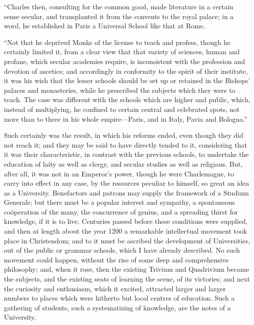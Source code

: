 ``Charles then, consulting
for the common good, made literature in a certain sense secular, and
transplanted it from the convents to the royal palace; in a word, he
established in Paris a Universal School like that at Rome.

``Not that he deprived Monks
of the license to teach and profess, though he certainly limited it,
from a clear view that that variety of sciences, human and profane,
which secular academies require, is inconsistent with the profession
and devotion of ascetics; and accordingly in conformity to the
spirit of their institute, it was his wish that the lesser schools
should be set up or retained in the Bishops' palaces and monasteries,
while he prescribed the subjects which they were to teach. The case
was different with the schools which are higher and public, which,
instead of multiplying, he confined to certain central and celebrated
spots, not more than to three in his whole empire—Paris, and in
Italy, Pavia and Bologna.''

Such certainly was the result,
in which his reforms ended, even though they did not reach it; and
they may be said to have directly tended to it, considering that it
was their characteristic, in contrast with the previous schools, to
undertake the education of laity as well as clergy, and secular
studies as well as religious. But, after all, it was not in an Emperor's
power, though he were Charlemagne, to carry into effect in any case,
by the resources peculiar to himself, so great an idea as a
University. Benefactors and patrons may supply the framework of a
Studium Generale; but there must be a popular interest and sympathy, a
spontaneous coöperation of the many, the concurrence of genius, and a
spreading thirst for knowledge, if it is to live. Centuries passed
before these conditions were supplied, and then at length about the
year 1200 a remarkable intellectual movement took place in
Christendom; and to it must be ascribed the development of
Universities, out of the public or grammar schools, which I have
already described. No such movement could happen, without the rise of
some deep and comprehensive philosophy; and, when it rose, then the
existing Trivium and Quadrivium became the subjects, and the existing
seats of learning the scene, of its victories; and next the curiosity
and enthusiasm, which it excited, attracted larger and larger
numbers to places which were hitherto but local centres of education.
Such a gathering of students, such a systematizing of knowledge, are
the notes of a University.

